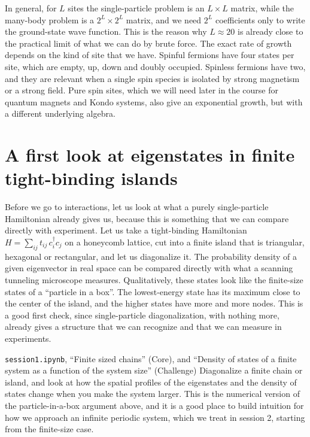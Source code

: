 In general, for $L$ sites the single-particle problem is an $L \times L$ matrix, while the
many-body problem is a $2^L \times 2^L$ matrix, and we need $2^L$ coefficients only to write the
ground-state wave function. This is the reason why $L \approx 20$ is already close to the practical
limit of what we can do by brute force. The exact rate of growth depends on the kind of site that we
have. Spinful fermions have four states per site, which are empty, up, down and doubly occupied.
Spinless fermions have two, and they are relevant when a single spin species is isolated by strong
magnetism or a strong field. Pure spin sites, which we will need later in the course for quantum
magnets and Kondo systems, also give an exponential growth, but with a different underlying
algebra.

\section{A first look at eigenstates in finite tight-binding islands}

Before we go to interactions, let us look at what a purely single-particle Hamiltonian already gives
us, because this is something that we can compare directly with experiment. Let us take a
tight-binding Hamiltonian $H = \sum_{ij} t_{ij}\, c_i^\dagger c_j$ on a honeycomb lattice, cut into
a finite island that is triangular, hexagonal or rectangular, and let us diagonalize it. The
probability density of a given eigenvector in real space can be compared directly with what a
scanning tunneling microscope measures. Qualitatively, these states look like the finite-size
states of a ``particle in a box''. The lowest-energy state has its maximum close to the center of
the island, and the higher states have more and more nodes. This is a good first check, since
single-particle diagonalization, with nothing more, already gives a structure that we can recognize
and that we can measure in experiments.

\begin{notebookbox}{\texttt{session1.ipynb}, ``Finite sized chains'' (Core), and ``Density of states of a finite system as a function of the system size'' (Challenge)}
Diagonalize a finite chain or island, and look at how the spatial profiles of the eigenstates and
the density of states change when you make the system larger. This is the numerical version of the
particle-in-a-box argument above, and it is a good place to build intuition for how we approach an
infinite periodic system, which we treat in session 2, starting from the finite-size case.
\end{notebookbox}

